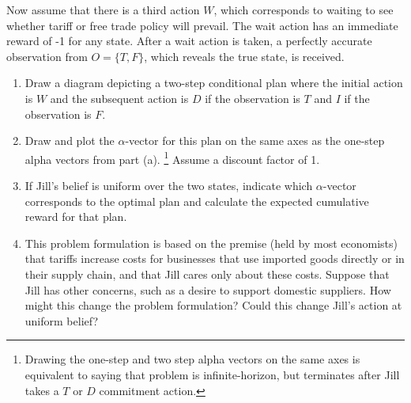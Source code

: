 \documentclass{article}
\theoremstyle{definition}
\begin{document}
Now assume that there is a third action $W$, which corresponds to waiting to see whether tariff or free trade policy will prevail. The wait action has an immediate reward of -1 for any state. After a wait action is taken, a perfectly accurate observation from $O = \{T, F\}$, which reveals the true state, is received.

\begin{enumerate}[label=\alph*),resume,noitemsep]
    \item Draw a diagram depicting a two-step conditional plan where the initial action is $W$ and the subsequent action is $D$ if the observation is $T$ and $I$ if the observation is $F$.
    \item Draw and plot the $\alpha$-vector for this plan on the same axes as the one-step alpha vectors from part (a). \footnote{Drawing the one-step and two step alpha vectors on the same axes is equivalent to saying that problem is infinite-horizon, but terminates after Jill takes a $T$ or $D$ commitment action.} Assume a discount factor of 1.
    \item If Jill's belief is uniform over the two states, indicate which $\alpha$-vector corresponds to the optimal plan and calculate the expected cumulative reward for that plan.
    \item This problem formulation is based on the premise (held by most economists) that tariffs increase costs for businesses that use imported goods directly or in their supply chain, and that Jill cares only about these costs. Suppose that Jill has other concerns, such as a desire to support domestic suppliers. How might this change the problem formulation? Could this change Jill's action at uniform belief?
\end{enumerate}
\end{document}
